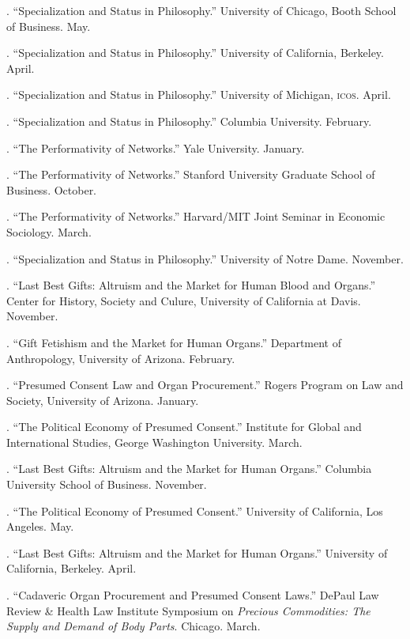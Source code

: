 \documentclass[11pt]{article}
\begin{document}
\medskip

. ``Specialization and Status in Philosophy.'' University of Chicago, Booth School of Business. May.

. ``Specialization and Status in Philosophy.'' University of California, Berkeley. April. 

. ``Specialization and Status in Philosophy.'' University of Michigan, \textsc{icos}. April.

. ``Specialization and Status in Philosophy.'' Columbia University. February. 

. ``The Performativity of Networks.'' Yale University. January.

. ``The Performativity of Networks.'' Stanford University Graduate School of Business. October. 

. ``The Performativity of Networks.'' Harvard/MIT Joint Seminar in Economic Sociology. March.

. ``Specialization and Status in Philosophy.'' University of Notre Dame. November. 

. ``Last Best Gifts: Altruism and the Market for Human Blood and Organs.'' Center for History, Society and Culure, University of California at Davis. November.

. ``Gift Fetishism and the Market for Human Organs.'' Department of Anthropology, University of Arizona. February. 

. ``Presumed Consent Law and Organ Procurement.'' Rogers Program on Law and Society, University of Arizona. January. 

. ``The Political Economy of Presumed Consent.'' Institute for Global
and International Studies, George Washington University. March.

. ``Last Best Gifts: Altruism and the Market for Human Organs.''
Columbia University School of Business. November. 

. ``The Political Economy of Presumed Consent.'' University of California, Los Angeles. May.

. ``Last Best Gifts: Altruism and the Market for Human Organs.''
University of California, Berkeley. April.

. ``Cadaveric Organ Procurement and Presumed Consent Laws.'' DePaul
Law Review \& Health Law Institute Symposium on \emph{Precious Commodities: The
Supply and Demand of Body Parts}. Chicago. March. 
\end{document}
